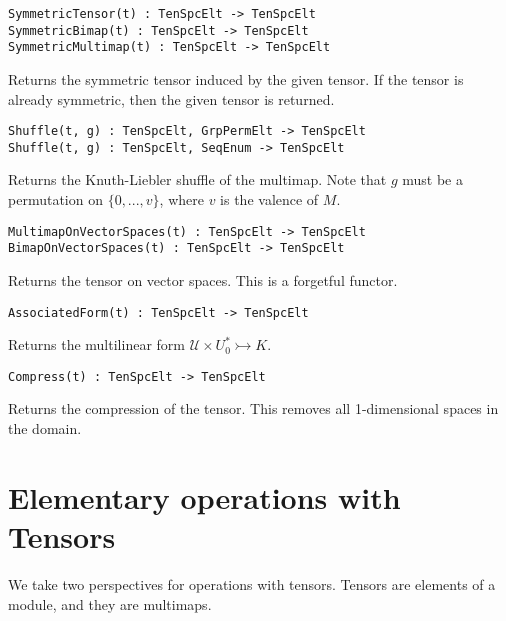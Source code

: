 \documentclass{amsart}
\begin{document}
\color{blue}
{\small \begin{verbatim}
SymmetricTensor(t) : TenSpcElt -> TenSpcElt
SymmetricBimap(t) : TenSpcElt -> TenSpcElt
SymmetricMultimap(t) : TenSpcElt -> TenSpcElt
\end{verbatim} }
\color{black}

Returns the symmetric tensor induced by the given tensor. If the tensor is 
already symmetric, then the given tensor is returned.

\color{blue}
{\small \begin{verbatim}
Shuffle(t, g) : TenSpcElt, GrpPermElt -> TenSpcElt
Shuffle(t, g) : TenSpcElt, SeqEnum -> TenSpcElt
\end{verbatim} }
\color{black}

Returns the Knuth-Liebler shuffle of the multimap. Note that $g$ must be a 
permutation on $\{0,...,v\}$, where $v$ is the valence of $M$.

\color{blue}
{\small \begin{verbatim}
MultimapOnVectorSpaces(t) : TenSpcElt -> TenSpcElt
BimapOnVectorSpaces(t) : TenSpcElt -> TenSpcElt
\end{verbatim} }
\color{black}

Returns the tensor on vector spaces. This is a forgetful functor. 

\color{blue}
{\small \begin{verbatim}
AssociatedForm(t) : TenSpcElt -> TenSpcElt
\end{verbatim} }
\color{black}

Returns the multilinear form $\mathcal{U}\times U_0^*\rightarrowtail K$.

\color{blue}
{\small \begin{verbatim}
Compress(t) : TenSpcElt -> TenSpcElt
\end{verbatim} }
\color{black}

Returns the compression of the tensor. This removes all 1-dimensional spaces in
the domain.


\section{Elementary operations with Tensors}

We take two perspectives for operations with tensors. Tensors are elements of a
module, and they are multimaps.
\end{document}
